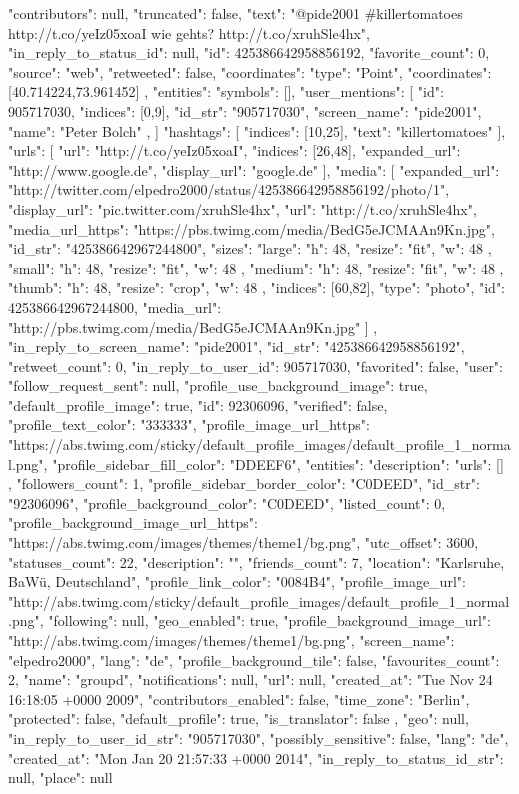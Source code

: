 {
	"contributors": null,
	"truncated": false,
	"text": "@pide2001 #killertomatoes http://t.co/yeIz05xoaI wie gehts? http://t.co/xruhSle4hx",
	"in_reply_to_status_id": null,
	"id": 425386642958856192,
	"favorite_count": 0,
	"source": "web",
	"retweeted": false,
	"coordinates": {
		"type": "Point",
		"coordinates": [40.714224,­73.961452]
	},
	"entities": {
		"symbols": [],
		"user_mentions": [{
			"id": 905717030,
			"indices": [0,9],
			"id_str": "905717030",
			"screen_name": "pide2001",
			"name": "Peter Bolch" ,
		}]
		"hashtags": [{
			"indices": [10,25],
			"text": "killertomatoes"
		}],
		"urls": [{
			"url": "http://t.co/yeIz05xoaI",
			"indices": [26,48],
			"expanded_url": "http://www.google.de",
			"display_url": "google.de"
		}],
		"media": [{
			"expanded_url": "http://twitter.com/elpedro2000/status/425386642958856192/photo/1",
			"display_url": "pic.twitter.com/xruhSle4hx",
			"url": "http://t.co/xruhSle4hx",
			"media_url_https": "https://pbs.twimg.com/media/BedG5eJCMAAn9Kn.jpg",
			"id_str": "425386642967244800",
			"sizes": {
				"large": {
					"h": 48,
					"resize": "fit",
					"w": 48
				},
				"small": {
					"h": 48,
					"resize": "fit",
					"w": 48
				},
				"medium": {
					"h": 48,
					"resize": "fit",
					"w": 48
				},
				"thumb": {
					"h": 48,
					"resize": "crop",
					"w": 48
				}
			},
			"indices": [60,82],
			"type": "photo",
			"id": 425386642967244800,
			"media_url": "http://pbs.twimg.com/media/BedG5eJCMAAn9Kn.jpg"
	}]
	},
	"in_reply_to_screen_name": "pide2001",
	"id_str": "425386642958856192",
	"retweet_count": 0,
	"in_reply_to_user_id": 905717030,
	"favorited": false,
	"user": {
	"follow_request_sent": null,
	"profile_use_background_image": true,
	"default_profile_image": true,
	"id": 92306096,
	"verified": false,
	"profile_text_color": "333333",
	"profile_image_url_https":
	"https://abs.twimg.com/sticky/default_profile_images/default_profile_1_normal.png",
	"profile_sidebar_fill_color": "DDEEF6",
	"entities": {
	"description": {
	"urls": []
	}
	},
	"followers_count": 1,
	"profile_sidebar_border_color": "C0DEED",
	"id_str": "92306096",
	"profile_background_color": "C0DEED",
	"listed_count": 0,
	"profile_background_image_url_https": "https://abs.twimg.com/images/themes/theme1/bg.png",
	"utc_offset": 3600,
	"statuses_count": 22,
	"description": "",
	"friends_count": 7,
	"location": "Karlsruhe, BaWü, Deutschland",
	"profile_link_color": "0084B4",
	"profile_image_url":
	"http://abs.twimg.com/sticky/default_profile_images/default_profile_1_normal.png",
	"following": null,
	"geo_enabled": true,
	"profile_background_image_url": "http://abs.twimg.com/images/themes/theme1/bg.png",
	"screen_name": "elpedro2000",
	"lang": "de",
	"profile_background_tile": false,
	"favourites_count": 2,
	"name": "groupd",
	"notifications": null,
	"url": null,
	"created_at": "Tue Nov 24 16:18:05 +0000 2009",
	"contributors_enabled": false,
	"time_zone": "Berlin",
	"protected": false,
	"default_profile": true,
	"is_translator": false
	},
	"geo": null,
	"in_reply_to_user_id_str": "905717030",
	"possibly_sensitive": false,
	"lang": "de",
	"created_at": "Mon Jan 20 21:57:33 +0000 2014",
	"in_reply_to_status_id_str": null,
	"place": null
}